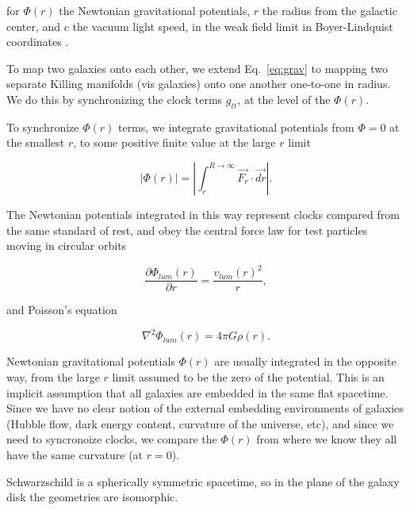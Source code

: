 \documentclass[reprint,%
 amsmath,amssymb,
 aps,
]{revtex4-1}
\begin{document}
for $\Phi (r)$ 
the Newtonian  gravitational potentials, $r$  the radius from the galactic center, and $c$   the vacuum light speed, in the weak field limit  in Boyer-Lindquist coordinates \cite{Hartle}. 
  
To map two galaxies onto each other, we extend   Eq.~\ref{eq:grav} to   mapping two separate Killing manifolds (vis galaxies) onto one another  one-to-one in radius. We do this by synchronizing the 
 clock terms  $g_{tt}$,  at the level of  the   $\Phi (r)$. 
 
 To synchronize $\Phi (r)$ terms, we   integrate    gravitational potentials from   $\Phi = 0$ at the  smallest $r$,  to some positive finite value at the large $r$ limit
    
  
 
    \begin{equation}
     | \Phi  (r) |= \left| \int^{R\to \infty}_{r} \vec{F_r}\cdot\vec{dr} \right|.
      \label{eq:Newt2}
      \end{equation}
 
   The Newtonian potentials integrated in this way  represent clocks compared from the same standard of rest, and   obey the central force law for test particles moving in circular orbits

\begin{equation}
 \frac{\partial \Phi_{lum}(r)}{\partial r}    =\frac{v_{lum}(r)^2}{r},  
    \label{zoochance1}
\end{equation}

 and Poisson's equation
 
\begin{equation}
\nabla^2 \Phi_{lum} (r) = 4\pi G \rho (r).   
    \label{whatsgood}
\end{equation}

 
 
   Newtonian gravitational potentials $\Phi(r)$  are usually integrated in the opposite way, from the large $r$ limit assumed to be the zero of the 
     potential. This is  an implicit assumption that all galaxies are embedded in the same flat spacetime. Since we have no clear notion of the external embedding environments of galaxies (Hubble flow, dark energy content, curvature of the universe, etc), and since we need to syncronoize clocks,  we compare the 
   $\Phi(r)$ from where we know they all have the same curvature (at $r=0$).
   
    
 
Schwarzschild is a spherically symmetric spacetime, so in the plane of the galaxy disk the geometries are isomorphic. 
\end{document}
